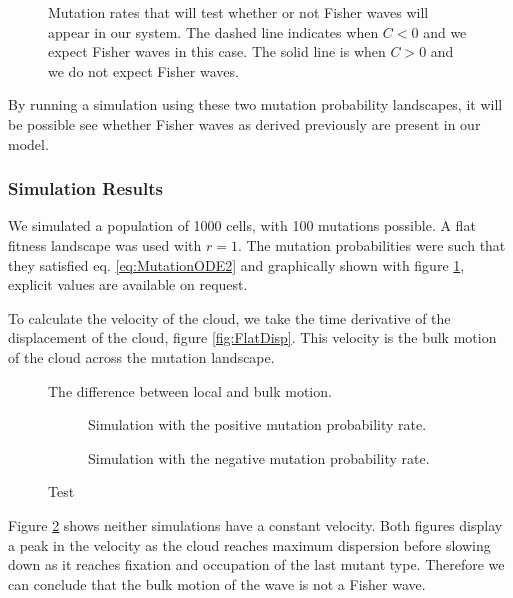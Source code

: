 \documentclass[12pt, a4paper,]{article}
\begin{document}
\begin{figure}[H]
\centering

\caption{Mutation rates that will test whether or not Fisher waves will appear in our system. The dashed line indicates when $C < 0$ and we expect Fisher waves in this case. The solid line is when $C > 0$ and we do not expect Fisher waves. }
\label{fig:mutationRateWaves}
\end{figure}

By running a simulation using these two mutation probability landscapes, it will be possible see whether Fisher waves as derived previously are present in our model. 

\subsubsection{Simulation Results}

We simulated a population of 1000 cells, with 100 mutations possible. A flat fitness landscape was used with $r=1$. The mutation probabilities were such that they satisfied eq. \eqref{eq:MutationODE2} and graphically shown with figure \ref{fig:mutationRateWaves}, explicit values are available on request. 

To calculate the velocity of the cloud, we take the time derivative of the displacement of the cloud, figure \ref{fig:FlatDisp}. This velocity is the bulk motion of the cloud across the mutation landscape. 

\begin{figure}[H]
\centering

\caption{The difference between local and bulk motion.}
\end{figure}

\begin{figure}[H]
	\begin{subfigure}[h]{0.5 \textwidth}
		
		\caption{Simulation with the positive mutation probability rate.}
	\end{subfigure}
	\begin{subfigure}[h]{0.5 \textwidth}
		
		\caption{Simulation with the negative mutation probability rate.}
	\end{subfigure}
	\caption{Test}
	\label{fig:BulkSimVel}
\end{figure}

Figure \ref{fig:BulkSimVel} shows neither simulations have a constant velocity. Both figures display a peak in the velocity as the cloud reaches maximum dispersion before slowing down as it reaches fixation and occupation of the last mutant type. Therefore we can conclude that the bulk motion of the wave is not a Fisher wave.
\end{document}
